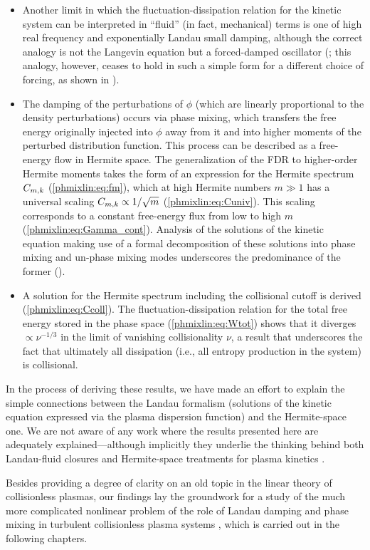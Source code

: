 \begin{itemize}
\item Another limit in which the fluctuation-dissipation relation for the kinetic system can be 
interpreted in ``fluid'' (in fact, mechanical) terms is one of high real 
frequency and exponentially Landau small damping, although the correct 
analogy is not the Langevin equation but a forced-damped 
oscillator (; this analogy, however, ceases to hold 
in such a simple form for a different choice of forcing, as shown in ).

\item The damping of the perturbations of $\phi$ (which are linearly 
proportional to the density perturbations) occurs via phase mixing, which 
transfers the free energy originally injected into $\phi$ away from it 
and into higher moments of the perturbed distribution function. This 
process can be described as a free-energy flow in Hermite space. 
The generalization of the FDR to higher-order Hermite moments 
takes the form of an expression for the Hermite spectrum $C_{m,k}$ 
(\eqref{phmixlin:eq:fm}), which at high Hermite numbers $m\gg1$ has a universal 
scaling $C_{m,k}\propto 1/\sqrt{m}$ (\eqref{phmixlin:eq:Cuniv}). This scaling 
corresponds to a constant free-energy flux from low to high $m$ 
(\eqref{phmixlin:eq:Gamma_cont}). Analysis of the solutions of the kinetic equation 
making use of a formal decomposition of these solutions into phase mixing 
and un-phase mixing modes underscores the predominance of the former 
(). 

\item A solution for the Hermite spectrum including the collisional 
cutoff is derived (\eqref{phmixlin:eq:Ccoll}). The fluctuation-dissipation relation for the total free 
energy stored in the phase space (\eqref{phmixlin:eq:Wtot}) shows that it 
diverges $\propto\nu^{-1/3}$ in the limit of vanishing collisionality 
$\nu$, a result that underscores the fact that ultimately all 
dissipation (i.e., all entropy production in the system) is collisional.\\ 

\end{itemize}

In the process of deriving these results, we have made an effort 
to explain the simple connections between the Landau formalism 
(solutions of the kinetic equation expressed via the plasma dispersion function)
and the Hermite-space one. 
We are not aware of any work where 
the results presented here are adequately explained---although implicitly they underlie 
the thinking behind both Landau-fluid closures 
\cite{hammett90,hammett92,hedrick92,dorland93,snyder97,passot04,goswami05,passot07}
and Hermite-space treatments for plasma kinetics
\cite{armstrong67,grant67a,hammett93,parker95,ng99,watanabe04,zocco11,hatch13,loureiro13,plunk14}.

Besides providing a degree of clarity on an old 
topic in the linear theory of collisionless plasmas, our findings lay the groundwork for 
a study of the much more complicated nonlinear problem of the role of Landau 
damping and phase mixing in turbulent collisionless plasma systems 
\cite{schekochihin14, kanekar14b}, which is carried out in the following chapters.

	

